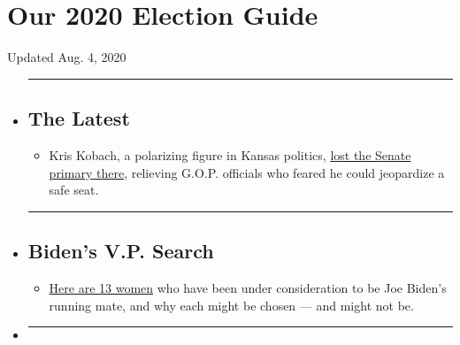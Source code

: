 \hypertarget{our-2020-election-guide}{%
\section{Our 2020 Election Guide}\label{our-2020-election-guide}}

Updated Aug. 4, 2020

\begin{itemize}
\item
  \begin{center}\rule{0.5\linewidth}{\linethickness}\end{center}

  \hypertarget{the-latest}{%
  \subsection{The Latest}\label{the-latest}}

  \begin{itemize}
  \tightlist
  \item
    Kris Kobach, a polarizing figure in Kansas politics,
    \href{https://www.nytimes.com/2020/08/04/us/politics/kobach-tlaib.html?action=click\&pgtype=Article\&state=default\&region=BELOW_MAIN_CONTENT\&context=storylines_guide}{lost
    the Senate primary there}, relieving G.O.P. officials who feared he
    could jeopardize a safe seat.
  \end{itemize}
\item
  \begin{center}\rule{0.5\linewidth}{\linethickness}\end{center}

  \hypertarget{bidens-vp-search}{%
  \subsection{Biden's V.P. Search}\label{bidens-vp-search}}

  \begin{itemize}
  \tightlist
  \item
    \href{https://www.nytimes.com/article/biden-vice-president-2020.html?action=click\&pgtype=Article\&state=default\&region=BELOW_MAIN_CONTENT\&context=storylines_guide}{Here
    are 13 women} who have been under consideration to be Joe Biden's
    running mate, and why each might be chosen --- and might not be.
  \end{itemize}
\item
  \begin{center}\rule{0.5\linewidth}{\linethickness}\end{center}


\end{itemize}
